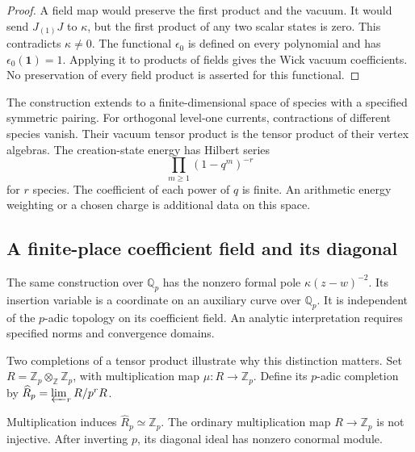 \begin{proof}
A field map would preserve the first product and the
vacuum. It would send \(J_{(1)}J\) to \(\kappa\),
but the first product of any two scalar states is
zero. This contradicts \(\kappa\ne0\).
The functional \(\epsilon_0\) is defined on every
polynomial and has \(\epsilon_0(\mathbf1)=1\).
Applying it to products of fields gives the Wick
vacuum coefficients. No preservation of every
field product is asserted for this functional.
\end{proof}

The construction extends to a finite-dimensional
space of species with a specified symmetric pairing.
For orthogonal level-one currents, contractions of
different species vanish. Their vacuum tensor product
is the tensor product of their vertex algebras. The
creation-state energy has Hilbert series
\[
                     \prod_{m\geq1}(1-q^m)^{-r}
\]
for \(r\) species. The coefficient of each power of
\(q\) is finite. An arithmetic energy weighting or
a chosen charge is additional data on this space.

\subsection{A finite-place coefficient field and its diagonal}

The same construction over \(\mathbb Q_p\)
has the nonzero formal pole
\(\kappa(z-w)^{-2}\).
Its insertion variable is a coordinate on
an auxiliary curve over \(\mathbb Q_p\).
It is independent of the \(p\)-adic
topology on its coefficient field.
An analytic interpretation requires specified
norms and convergence domains.

Two completions of a tensor product
illustrate why this distinction matters.
Set \(R=\mathbb Z_p\otimes_{\mathbb Z}\mathbb Z_p\),
with multiplication map \(\mu:R\to\mathbb Z_p\).
Define its \(p\)-adic completion by
\(\widehat R_p=\varprojlim_r R/p^rR\).

\begin{proposition}\label{v4-prop:singular-padic-tensor}
Multiplication induces
\(\widehat R_p\simeq\mathbb Z_p\).
The ordinary multiplication map
\(R\to\mathbb Z_p\) is not injective.
After inverting \(p\), its diagonal ideal
has nonzero conormal module.
\end{proposition}


